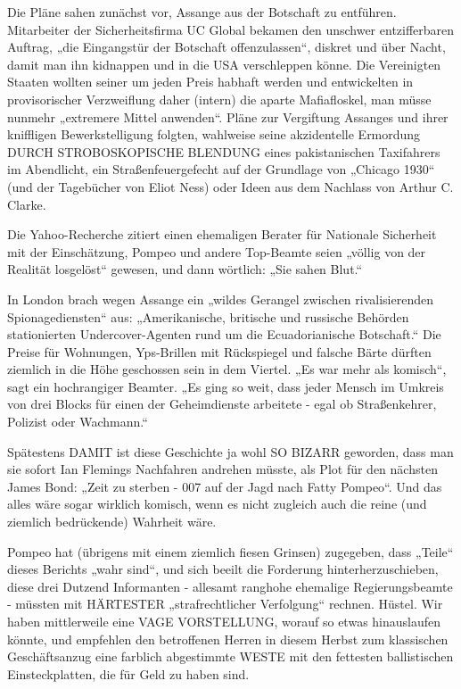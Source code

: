 \begin{multicols}{2}
Die Pläne sahen zunächst vor, Assange aus der Botschaft
zu entführen. Mitarbeiter der Sicherheitsfirma UC Global bekamen den unschwer entzifferbaren Auftrag, „die
Eingangstür der Botschaft offenzulassen“, diskret und
über Nacht, damit man ihn kidnappen und in die USA
verschleppen könne. Die Vereinigten Staaten wollten
seiner um jeden Preis habhaft werden und entwickelten in provisorischer Verzweiflung daher (intern) die
aparte Mafiafloskel, man müsse nunmehr „extremere Mittel anwenden“. Pläne zur Vergiftung Assanges und
ihrer kniffligen Bewerkstelligung folgten, wahlweise
seine akzidentelle Ermordung DURCH STROBOSKOPISCHE BLENDUNG eines pakistanischen Taxifahrers im
Abendlicht, ein Straßenfeuergefecht auf der Grundlage
von „Chicago 1930“ (und der Tagebücher von Eliot Ness)
oder Ideen aus dem Nachlass von Arthur C. Clarke.

Die Yahoo-Recherche zitiert einen ehemaligen Berater
für Nationale Sicherheit mit der Einschätzung, Pompeo
und andere Top-Beamte seien „völlig von der Realität
losgelöst“ gewesen, und dann wörtlich: „Sie sahen Blut.“

In London brach wegen Assange ein „wildes Gerangel
zwischen rivalisierenden Spionagediensten“ aus: „Amerikanische, britische und russische Behörden stationierten Undercover-Agenten rund um die Ecuadorianische
Botschaft.“ Die Preise für Wohnungen, Yps-Brillen mit
Rückspiegel und falsche Bärte dürften ziemlich in die
Höhe geschossen sein in dem Viertel. „Es war mehr als
komisch“, sagt ein hochrangiger Beamter. „Es ging so
weit, dass jeder Mensch im Umkreis von drei Blocks für
einen der Geheimdienste arbeitete - egal ob Straßenkehrer, Polizist oder Wachmann.“

Spätestens DAMIT ist diese Geschichte ja wohl SO BIZARR geworden, dass man sie sofort Ian Flemings Nachfahren andrehen müsste, als Plot für den nächsten James
Bond: „Zeit zu sterben - 007 auf der Jagd nach Fatty Pompeo“. Und das alles wäre sogar wirklich komisch, wenn
es nicht zugleich auch die reine (und ziemlich bedrückende) Wahrheit wäre.

Pompeo hat (übrigens mit einem ziemlich fiesen Grinsen) zugegeben, dass „Teile“ dieses Berichts „wahr sind“,
und sich beeilt die Forderung hinterherzuschieben,
diese drei Dutzend Informanten - allesamt ranghohe
ehemalige Regierungsbeamte - müssten mit HÄRTESTER „strafrechtlicher Verfolgung“ rechnen. Hüstel. Wir
haben mittlerweile eine VAGE VORSTELLUNG, worauf
so etwas hinauslaufen könnte, und empfehlen den betroffenen Herren in diesem Herbst zum klassischen Geschäftsanzug eine farblich abgestimmte WESTE mit den
fettesten ballistischen Einsteckplatten, die für Geld zu
haben sind.


\end{multicols}
